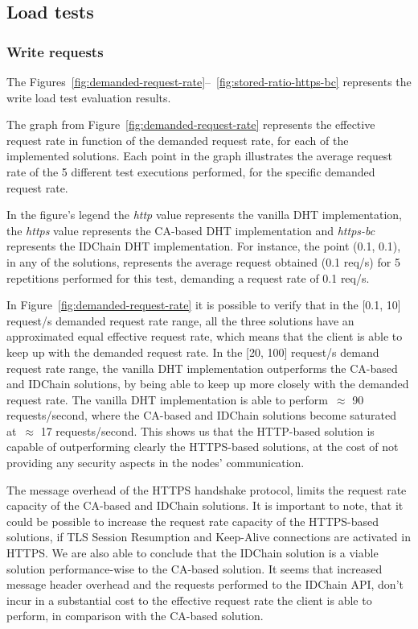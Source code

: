 \subsection{Load tests}
\label{section:load-tests}

\subsubsection{Write requests}

The Figures~\ref{fig:demanded-request-rate}–~\ref{fig:stored-ratio-https-bc} represents the write load test evaluation results.

The graph from Figure~\ref{fig:demanded-request-rate} represents the effective request rate in function of the demanded request rate, for each of the implemented solutions.
Each point in the graph illustrates the average request rate of the 5 different test executions performed, for the specific demanded request rate.

In the figure's legend the \textit{http} value represents the vanilla DHT implementation, the \textit{https} value represents the CA-based DHT implementation and \textit{https-bc} represents the IDChain DHT implementation.
For instance, the point (0.1, 0.1), in any of the solutions, represents the average request obtained (0.1 req/s) for 5 repetitions performed for this test, demanding a request rate of 0.1 req/s.

In Figure~\ref{fig:demanded-request-rate} it is possible to verify that in the [0.1, 10] request/s demanded request rate range, all the three solutions have an approximated equal effective request rate, which means that the client is able to keep up with the demanded request rate.
In the [20, 100] request/s demand request rate range, the vanilla DHT implementation outperforms the CA-based and IDChain solutions, by being able to keep up more closely with the demanded request rate.
The vanilla DHT implementation is able to perform~$\approx$ 90 requests/second, where the CA-based and IDChain solutions become saturated at~$\approx$ 17 requests/second.
This shows us that the HTTP-based solution is capable of outperforming clearly the HTTPS-based solutions, at the cost of not providing any security aspects in the nodes' communication.

The message overhead of the HTTPS handshake protocol, limits the request rate capacity of the CA-based and IDChain solutions.
It is important to note, that it could be possible to increase the request rate capacity of the HTTPS-based solutions, if TLS Session Resumption and Keep-Alive connections are activated in HTTPS.
We are also able to conclude that the IDChain solution is a viable solution performance-wise to the CA-based solution.
It seems that increased message header overhead and the requests performed to the IDChain API, don't incur in a substantial cost to the effective request rate the client is able to perform, in comparison with the CA-based solution.

